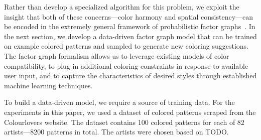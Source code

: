 Rather than develop a specialized algorithm for this problem, we exploit the insight that both of these concerns---color harmony and spatial consistency---can be encoded in the extremely general framework of probabilistic factor graphs~\cite{FactorGraphs}. In the next section, we develop a data-driven factor graph model that can be trained on example colored patterns and sampled to generate new coloring suggestions. The factor graph formalism allows us to leverage existing models of color compatibility, to plug in additional coloring constraints in response to available user input, and to capture the characteristics of desired styles through established machine learning techniques.

To build a data-driven model, we require a source of training data. For the experiments in this paper, we used a dataset of colored patterns scraped from the Colourlovers website. The dataset contains 100 colored patterns for each of 82 artists---8200 patterns in total. The artists were chosen based on TODO.~